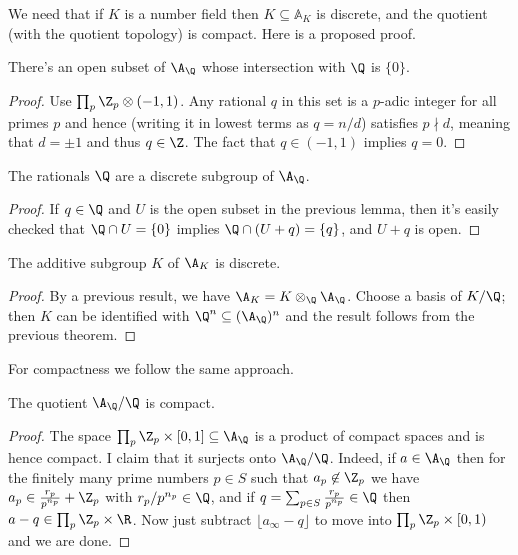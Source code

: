 We need that if $K$ is a number field then
$K\subseteq\mathbb{A}_K$ is discrete, and the quotient (with the
quotient topology) is compact. Here is a proposed proof.

\begin{theorem}
  \label{Rat.AdeleRing.zero_discrete}
  \leanok
  There's an open subset of $\A_{\Q}$ whose intersection with $\Q$ is $\{0\}$.
\end{theorem}
\begin{proof}
  Use $\prod_p{\Z_p}\otimes(-1,1)$. Any rational $q$ in this set is a $p$-adic
  integer for all primes $p$ and hence (writing it in lowest terms as $q=n/d$)
  satisfies $p\nmid d$, meaning that $d=\pm1$ and thus $q\in\Z$. The fact
  that $q\in(-1,1)$ implies $q=0$.
\end{proof}

\begin{theorem}
  \label{Rat.AdeleRing.discrete}
  \leanok
  The rationals $\Q$ are a discrete subgroup of $\A_{\Q}$.
\end{theorem}
\begin{proof}
  If $q\in\Q$ and $U$ is the open subset in the previous lemma, then
  it's easily checked that $\Q\cap U=\{0\}$ implies $\Q\cap (U+q)=\{q\}$,
  and $U+q$ is open.
\end{proof}

\begin{theorem}
  \label{NumberField.AdeleRing.discrete}
  \leanok
  The additive subgroup $K$ of $\A_K$ is discrete.
\end{theorem}
\begin{proof}
  By a previous result, we have $\A_K=K\otimes_{\Q}\A_{\Q}$.
  Choose a basis of $K/\Q$; then $K$ can be identified with $\Q^n\subseteq(\A_{\Q})^n$
  and the result follows from the previous theorem.
\end{proof}

For compactness we follow the same approach.

\begin{theorem}
  \label{Rat.AdeleRing.cocompact}
  \leanok
  The quotient $\A_{\Q}/\Q$ is compact.
\end{theorem}
\begin{proof}
  The space $\prod_p\Z_p\times[0,1]\subseteq\A_{\Q}$ is a product of compact spaces
  and is hence compact. I claim that it surjects onto $\A_{\Q}/\Q$. Indeed,
  if $a\in\A_{\Q}$ then for the finitely many prime numbers $p\in S$ such that $a_p\not\in\Z_p$
  we have $a_p\in\frac{r_p}{p^{n_p}}+\Z_p$ with $r_p/p^{n_p}\in\Q$, and
  if $q=\sum_{p\in S}\frac{r_p}{p^{n_p}}\in\Q$ then $a-q\in \prod_p\Z_p\times\R$.
  Now just subtract $\lfloor a_{\infty}-q\rfloor$ to move into $\prod_p\Z_p\times[0,1)$
  and we are done.
\end{proof}

